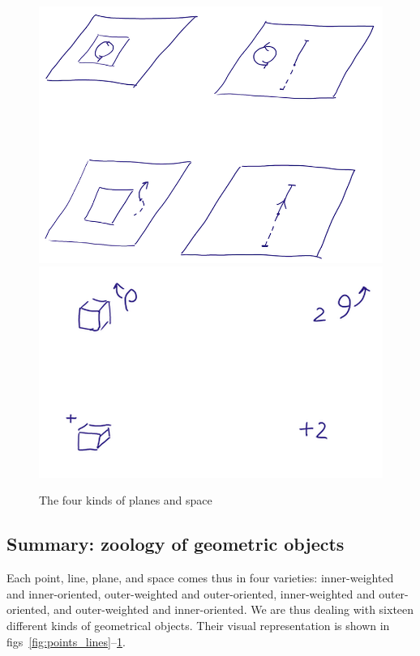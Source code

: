 \documentclass[\ifafour a4paper,12pt,\else a5paper,10pt,\fi%
onecolumn,oneside,article,%
british%
]{memoir}
\theoremstyle{remark}
\theoremstyle{innote}
\renewcommand*{\|}{\nonscript\,\vert\nonscript\;\mathopen{}}
\begin{document}
\begin{figure}[p!]%
 \centering\includegraphics[width=0.9\linewidth]{ex2b.png}\\[5em]\includegraphics[width=0.9\linewidth]{ex3b.png}%
\caption{The four kinds of planes and space}\label{fig:planes_space}
\end{figure}%

\subsection{Summary: zoology of geometric objects}
\label{sec:summary_kinds_objects}

Each point, line, plane, and space comes thus in four varieties:
inner-weighted and inner-oriented, outer-weighted and outer-oriented,
inner-weighted and outer-oriented, and outer-weighted and inner-oriented.
We are thus dealing with sixteen different kinds of geometrical objects.
Their visual representation is shown in
figs~\ref{fig:points_lines}--\ref{fig:planes_space}.
\end{document}
